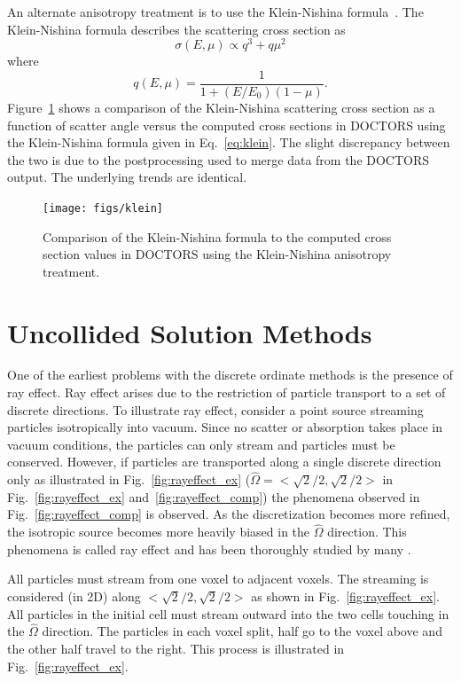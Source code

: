 An alternate anisotropy treatment is to use the Klein-Nishina formula~\citep{ref:shultisj}. The Klein-Nishina formula describes the scattering cross section as
\begin{equation}\label{eq:klein}
\sigma(E, \mu) \propto q^3 + q\mu^2
\end{equation}
where
\begin{equation}
q(E, \mu) = \frac{1}{1 + (E/E_0)(1-\mu)}.
\end{equation}
Figure~\ref{fig:klein} shows a comparison of the Klein-Nishina scattering cross section as a function of scatter angle versus the computed cross sections in DOCTORS using the Klein-Nishina formula given in Eq.~\ref{eq:klein}. The slight discrepancy between the two is due to the postprocessing used to merge data from the DOCTORS output. The underlying trends are identical.

\begin{figure}[tb]
  \begin{center}
   \texttt{[image: figs/klein]}
  \end{center}
  \caption{Comparison of the Klein-Nishina formula to the computed cross section values in DOCTORS using the Klein-Nishina anisotropy treatment.}
\label{fig:klein}
\end{figure}

\section{Uncollided Solution Methods}\label{sec:uncol}
One of the earliest problems with the discrete ordinate methods is the presence of ray effect. Ray effect arises due to the restriction of particle transport to a set of discrete directions. To illustrate ray effect, consider a point source streaming particles isotropically into vacuum. Since no scatter or absorption takes place in vacuum conditions, the particles can only stream and particles must be conserved. However, if particles are transported along a single discrete direction only as illustrated in Fig.~\ref{fig:rayeffect_ex} ($\hat{\Omega} = <\sqrt{2}/2, \sqrt{2}/2>$ in Fig.~\ref{fig:rayeffect_ex} and~\ref{fig:rayeffect_comp}) the phenomena observed in Fig.~\ref{fig:rayeffect_comp} is observed. As the discretization becomes more refined, the isotropic source becomes more heavily biased in the $\hat{\Omega}$ direction. This phenomena is called ray effect and has been thoroughly studied by many \citep{ref:mathewsk} \citep{ref:tencerj}.

All particles must stream from one voxel to adjacent voxels. The streaming is considered (in 2D) along $<\sqrt{2}/2, \sqrt{2}/2>$ as shown in Fig.~\ref{fig:rayeffect_ex}. All particles in the initial cell must stream outward into the two cells touching in the $\hat{\Omega}$ direction. The particles in each voxel split, half go to the voxel above and the other half travel to the right. This process is illustrated in Fig.~\ref{fig:rayeffect_ex}.

